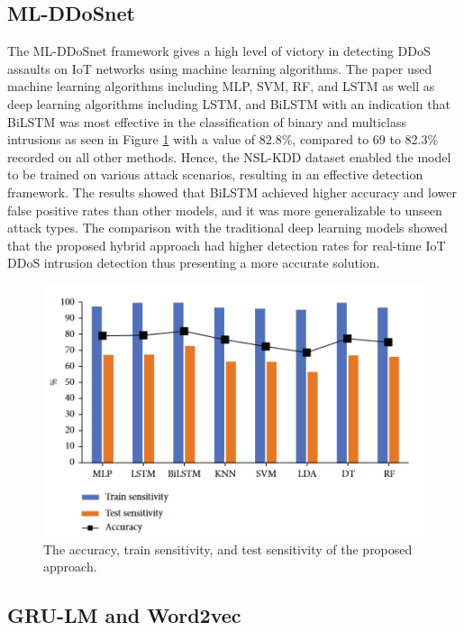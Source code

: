\documentclass[a4paper, 12pt]{article}
\begin{document}
\subsection{ML-DDoSnet}

The ML-DDoSnet framework gives a high level of victory in detecting DDoS assaults on IoT networks using machine learning algorithms. The paper used machine learning algorithms including MLP, SVM, RF, and LSTM as well as deep learning algorithms including LSTM, and BiLSTM with an indication that BiLSTM was most effective in the classification of binary and multiclass intrusions as seen in Figure \ref{fig:mlddos} with a value of 82.8\%, compared to 69 to 82.3\% recorded on all other methods.  Hence, the NSL-KDD dataset enabled the model to be trained on various attack scenarios, resulting in an effective detection framework. The results showed that BiLSTM achieved higher accuracy and lower false positive rates than other models, and it was more generalizable to unseen attack types. The comparison with the traditional deep learning models showed that the proposed hybrid approach had higher detection rates for real-time IoT DDoS intrusion detection thus presenting a more accurate solution. 

\begin{figure}[H]
    \centering
    \includegraphics[width=0.7\linewidth]{image-mlddos.png}
    \caption{The accuracy, train sensitivity, and test sensitivity of the proposed approach. \protect{}}
    \label{fig:mlddos}
\end{figure}

\clearpage

\subsection{GRU-LM and Word2vec}
\end{document}
